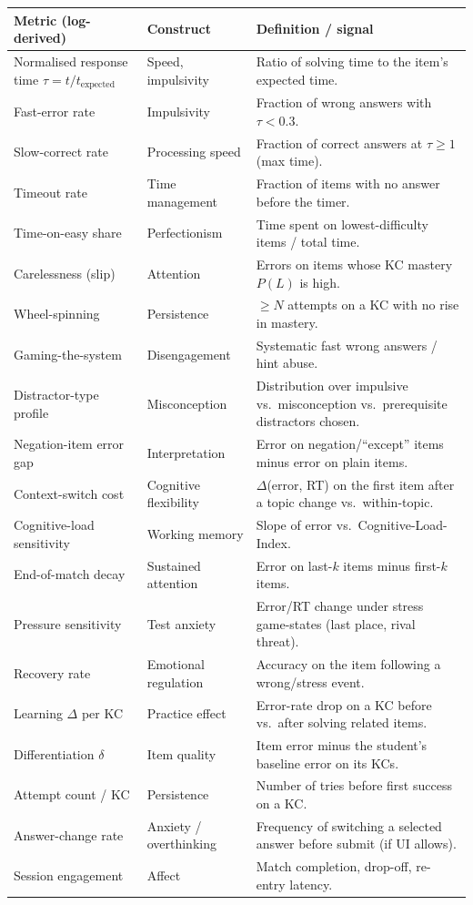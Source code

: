 \documentclass[11pt]{article}
\begin{document}
\begin{tabularx}{\textwidth}{@{}p{4.9cm}p{3.5cm}Y@{}}
\toprule
\textbf{Metric (log-derived)} & \textbf{Construct} & \textbf{Definition / signal}\\
\midrule
Normalised response time $\tau=t/t_{\text{expected}}$ & Speed, impulsivity & Ratio of solving time to the item's expected time.\\
Fast-error rate & Impulsivity & Fraction of wrong answers with $\tau<0.3$.\\
Slow-correct rate & Processing speed & Fraction of correct answers at $\tau\ge1$ (max time).\\
Timeout rate & Time management & Fraction of items with no answer before the timer.\\
Time-on-easy share & Perfectionism & Time spent on lowest-difficulty items / total time.\\
Carelessness (slip) & Attention & Errors on items whose KC mastery $P(L)$ is high.\\
Wheel-spinning & Persistence & $\ge N$ attempts on a KC with no rise in mastery.\\
Gaming-the-system & Disengagement & Systematic fast wrong answers / hint abuse.\\
Distractor-type profile & Misconception & Distribution over impulsive vs.\ misconception vs.\ prerequisite distractors chosen.\\
Negation-item error gap & Interpretation & Error on negation/``except'' items minus error on plain items.\\
Context-switch cost & Cognitive flexibility & $\Delta$(error, RT) on the first item after a topic change vs.\ within-topic.\\
Cognitive-load sensitivity & Working memory & Slope of error vs.\ Cognitive-Load-Index.\\
End-of-match decay & Sustained attention & Error on last-$k$ items minus first-$k$ items.\\
Pressure sensitivity & Test anxiety & Error/RT change under stress game-states (last place, rival threat).\\
Recovery rate & Emotional regulation & Accuracy on the item following a wrong/stress event.\\
Learning $\Delta$ per KC & Practice effect & Error-rate drop on a KC before vs.\ after solving related items.\\
Differentiation $\delta$ & Item quality & Item error minus the student's baseline error on its KCs.\\
Attempt count / KC & Persistence & Number of tries before first success on a KC.\\
Answer-change rate & Anxiety / overthinking & Frequency of switching a selected answer before submit (if UI allows).\\
Session engagement & Affect & Match completion, drop-off, re-entry latency.\\
\bottomrule
\end{tabularx}
\end{document}
